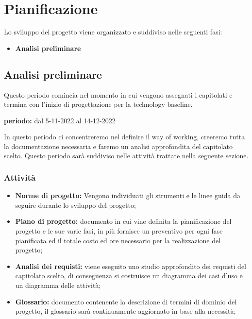 \section{Pianificazione}
Lo sviluppo del progetto viene organizzato e suddiviso nelle seguenti fasi:
\begin{itemize}
\item \textbf{Analisi preliminare}
\end{itemize}

\subsection{Analisi preliminare}
Questo periodo comincia nel momento in cui vengono assegnati i capitolati e termina con l'inizio di progettazione per la technology baseline.\\
\begin{center}
\textbf{periodo:} dal 5-11-2022 al 14-12-2022\\
\end{center}
In questo periodo ci concentreremo nel definire il way of working, creeremo tutta la documentazione necessaria e faremo un analisi approfondita del capitolato scelto.  Questo periodo sarà suddiviso nelle attività trattate nella seguente sezione.
\subsubsection{Attività}
\begin{itemize}
\item \textbf{Norme di progetto:} Vengono individuati gli strumenti e le linee guida da seguire durante lo sviluppo del progetto;
\item \textbf{Piano di progetto:} documento in cui vine definita la pianificazione del progetto e le sue varie fasi,  in più fornisce un preventivo per ogni fase pianificata ed il totale costo ed ore necessario per la realizzazione del progetto;
\item \textbf{Analisi dei requisti:} viene eseguito uno studio approfondito dei requisti del capitolato scelto,  di conseguenza si costruisce un diagramma dei casi d'uso e un diagramma delle attività;
\item \textbf{Glossario: } documento contenente la descrizione di termini di dominio del progetto, il glossario sarà continuamente aggiornato in base alla necessità;
\end{itemize}

